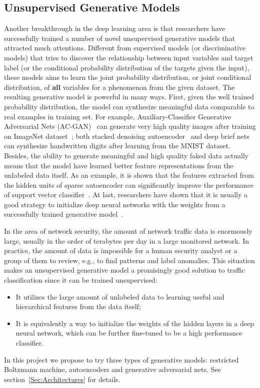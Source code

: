 \subsection{Unsupervised Generative Models}
Another breakthrough in the deep learning area is that researchers have successfully trained
a number of novel unsupervised generative models that attracted much attentions.
Different from supervised models (or discriminative models) that tries to discover
the relationship between input variables and target label (or the conditional probability distribution of the targets given the input),
these models aims to learn the joint probability distribution, or joint conditional distribution,
of \textbf{all} variables for a phenomenon from the given dataset.
The resulting generative model is powerful in many ways.
First, given the well trained probability distribution, the model can synthesize meaningful data
comparable to real examples in training set.
For example, Auxiliary-Classifier Generative Adversarial Nets (AC-GAN)~\cite{AC-GAN} can generate very high quality
images after training on ImageNet dataset~\cite{ImageNet};
both stacked denoising autoencoder~\cite{DenoiseAE} and deep brief nets~\cite{DeepBeliefNets} can synthesize
handwritten digits after learning from the MNIST dataset.
Besides, the ability to generate meaningful and high quality faked data actually means that
the model have learned better feature representations from the unlabeled data itself.
As an example, it is shown that the features extracted from the hidden units of sparse autoencoder
can significantly improve the performance of support vector classifier~\cite{SparseAE}.
At last, researchers have shown that it is usually a good strategy to initialize deep neural networks
with the weights from a successfully trained generative model~\cite{DeepBeliefNets, Momentum}.

In the area of network security, the amount of network traffic data is enormously large,
usually in the order of terabytes per day in a large monitored network.
In practice, the amount of data is impossible for a human security analyst or
a group of them to review, e.g., to find patterns and label anomalies.
This situation makes an unsupervised generative model a promisingly good solution
to traffic classification since it can be trained unsupervised:
\begin{itemize}
    \item It utilizes the large amount of unlabeled data to learning useful and hierarchical features
        from the data itself;
    \item It is equivalently a way to initialize the weights of the hidden layers
        in a deep neural network, which can be further fine-tuned to be a high performance classifier.
\end{itemize}
In this project we propose to try three types of generative models:
restricted Boltzmann machine, autoencoders and generative adversarial nets.
See section~\ref{Sec:Architectures} for details.

